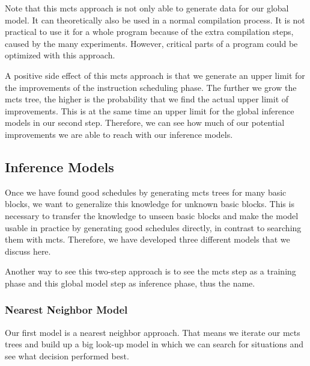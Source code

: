 Note that this \ac{mcts} approach is not only able to generate data for our global model.
It can theoretically also be used in a normal compilation process.
It is not practical to use it for a whole program because of the extra compilation steps, caused by the many experiments.
However, critical parts of a program could be optimized with this approach.

A positive side effect of this \ac{mcts} approach is that we generate an upper limit for the improvements of the instruction scheduling phase.
The further we grow the \ac{mcts} tree, the higher is the probability that we find the actual upper limit of improvements.
This is at the same time an upper limit for the global inference models in our second step.
Therefore, we can see how much of our potential improvements we are able to reach with our inference models.

\subsection{Inference Models}
\label{subsec:approach:ml:global}
Once we have found good schedules by generating \ac{mcts} trees for many basic blocks, we want to generalize this knowledge for unknown basic blocks.
This is necessary to transfer the knowledge to unseen basic blocks and make the model usable in practice by generating good schedules directly, in contrast to searching them with \ac{mcts}.
Therefore, we have developed three different models that we discuss here.

Another way to see this two-step approach is to see the \ac{mcts} step as a training phase and this global model step as inference phase, thus the name.

\subsubsection{Nearest Neighbor Model}
\label{sec:app:nearest-neighbor}
Our first model is a nearest neighbor approach.
That means we iterate our \ac{mcts} trees and build up a big look-up model in which we can search for situations and see what decision performed best.

